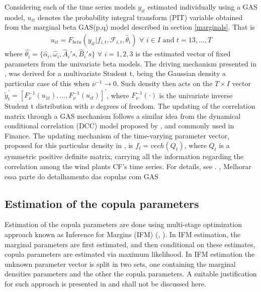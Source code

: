 \documentclass[a4paper]{IEEEtran}
\begin{document}
 Considering each of the time series models $y_{it}$ estimated individually using a GAS model, $u_{it}$ denotes the probability integral transform (PIT) variable obtained from the marginal beta GAS(p,q) model described in section \ref{marginals}. That is 
\begin{eqnarray}
u_{it}=F_{beta}(y_{it}|f_{i,t},\mathcal{F}_{i,t},\hat{\theta}_{i}) \,\, \forall \,\,i \in I\,\, \mbox{and} \,\, t=13,\ldots,T
\end{eqnarray}
\noindent
where $\hat{\theta_i}=\{\hat{\alpha} _{i},\hat{\omega} _{i}, \hat{A}_{i}'s, \hat{B}_{i}'s\}\,\,  \forall \,\, i=1,2,3$ is the estimated vector of fixed parameters from the univariate beta models. The driving mechanism presented in \cite{creal2011dynamic}, was derived for a multivariate Student t, being the Gaussian density a particular case of this when $\nu^{-1} \to 0$. Such density then acts on the $T \times I$ vector $\tilde{y}_{t}^{'}=[F_{\nu}^{-1}(u_{1t}), ..., F_{\nu}^{-1}(u_{it})]^{'}$, where $F_{\nu}^{-1}(\cdot)$ is the univariate inverse Student t distribution with $\nu$ degrees of freedom. The updating of the correlation matrix through a GAS mechanism follows a similar idea from the dynamical conditional correlation (DCC) model proposed by \cite{engle2002dynamic}, and commonly used in Finance. The updating mechanism of the time-varying parameter vector, proposed for this particular density in \cite{creal2011dynamic}, is $f_{t}=vech(Q_{t})$, where $Q_{t}$ is a symmetric positive definite matrix, carrying all the information regarding the correlation among the wind plants CF's time series. For details, see \cite{creal2011dynamic}. {\color{red}, Melhorar essa parte do detalhamento das copulas com GAS}

\subsection{Estimation of the copula parameters}\label{copula_par}
Estimation of the copula parameters are done using multi-stage optimization approach known as Inference for Margins (IFM) (\cite{xu1996statistical}, \cite{joe1997multivariate}). In IFM estimation, the marginal parameters are first estimated, and then conditional on these estimates,  copula parameters are estimated via maximum likelihood. In IFM estimation the unknown parameter vector is split in two sets, one containing the marginal densities parameters and the other the copula parameters. A suitable justification for such approach is presented in \cite{joe2005asymptotic} and shall not be discussed here.
\end{document}
